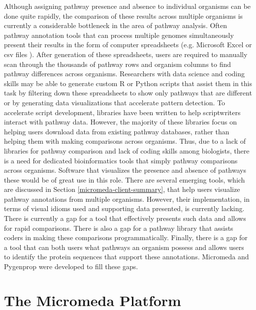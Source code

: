 Although assigning pathway presence and absence to individual organisms can be done quite rapidly, the comparison of these results across multiple organisms is currently a considerable bottleneck in the area of pathway analysis. Often pathway annotation tools that can process multiple genomes simultaneously present their results in the form of computer spreadsheets (e.g. Microsoft Excel or \gls{csv} files \cite{RFC4180}). After generation of these spreadsheets, users are required to manually scan through the thousands of pathway rows and organism columns to find pathway differences across organisms. Researchers with data science and coding skills may be able to generate custom R or Python scripts that assist them in this task by filtering down these spreadsheets to show only pathways that are different or by generating data visualizations that accelerate pattern detection. To accelerate script development, libraries have been written to help scriptwriters interact with pathway data. However, the majority of these libraries focus on helping users download data from existing pathway databases, rather than helping them with making comparisons across organisms. Thus, due to a lack of libraries for pathway comparison and lack of coding skills among biologists, there is a need for dedicated bioinformatics tools that simply pathway comparisons across organisms. Software that visualizes the presence and absence of pathways these would be of great use in this role. There are several emerging tools, which are discussed in Section \ref{micromeda-client-summary}, that help users visualize pathway annotations from multiple organisms. However, their implementation, in terms of visual idioms used and supporting data presented, is currently lacking. There is currently a gap for a tool that effectively presents such data and allows for rapid comparisons. There is also a gap for a pathway library that assists coders in making these comparisons programmatically. Finally, there is a gap for a tool that can both users what pathways an organism possess and allows users to identify the protein sequences that support these annotations. Micromeda and Pygenprop were developed to fill these gaps.

\section{The Micromeda Platform} \label{micromeda-overview}

